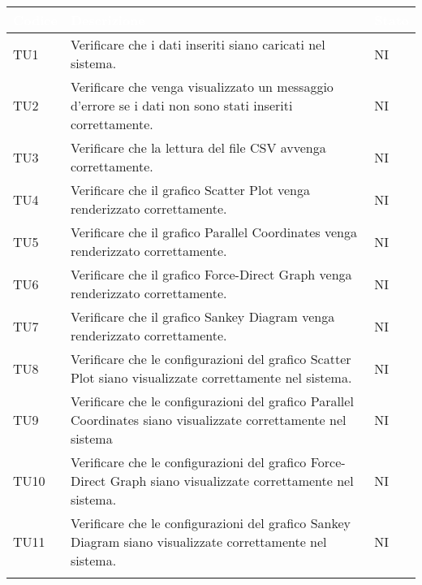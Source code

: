     \begin{center}
        \renewcommand\arraystretch{1.5}
        \centering
        \begin{longtable}{|p{1.5cm}|p{11cm}|p{1cm}|}
        \hline
        \rowcolor[HTML]{036400}
        \textcolor{white}{\textbf{Codice}} & \textcolor{white}{\textbf{Descrizione}} & \textcolor{white}{\textbf{Stato}} \\ \hline
            \rowcolor[HTML]{EFEFEF}
            TU1 & Verificare che i dati inseriti siano caricati nel sistema. & NI\\ \hline
            \rowcolor[HTML]{C0C0C0}
            TU2 & Verificare che venga visualizzato un messaggio d'errore se i dati non sono stati inseriti correttamente. & NI\\ \hline
            \rowcolor[HTML]{EFEFEF}
            TU3 & Verificare che la lettura del file CSV avvenga correttamente. & NI\\ \hline
            \rowcolor[HTML]{C0C0C0}
            TU4 & Verificare che il grafico Scatter Plot venga renderizzato correttamente. & NI\\ \hline
            \rowcolor[HTML]{EFEFEF}
            TU5 & Verificare che il grafico Parallel Coordinates venga renderizzato correttamente. & NI\\ \hline
            \rowcolor[HTML]{C0C0C0}
            TU6 & Verificare che il grafico Force-Direct Graph venga renderizzato correttamente. & NI\\ \hline
            \rowcolor[HTML]{EFEFEF}
            TU7 & Verificare che il grafico Sankey Diagram venga renderizzato correttamente. & NI\\ \hline
            \rowcolor[HTML]{C0C0C0}
            TU8 & Verificare che le configurazioni del grafico Scatter Plot siano visualizzate correttamente nel sistema. & NI\\ \hline
            \rowcolor[HTML]{EFEFEF}
            TU9 & Verificare che le configurazioni del grafico Parallel Coordinates siano visualizzate correttamente nel sistema & NI\\ \hline
            \rowcolor[HTML]{C0C0C0}
            TU10 & Verificare che le configurazioni del grafico Force-Direct Graph siano visualizzate correttamente nel sistema. & NI\\ \hline
            \rowcolor[HTML]{EFEFEF}
            TU11 & Verificare che le configurazioni del grafico Sankey Diagram siano visualizzate correttamente nel sistema. & NI\\ \hline
            \rowcolor[HTML]{C0C0C0}

\end{longtable}
\end{center}
